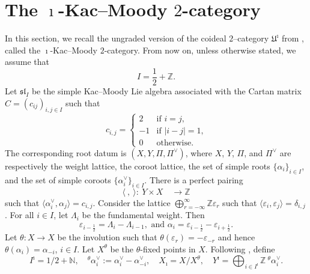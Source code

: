 \documentclass[a4,10pt]{amsart}
\numberwithin{equation}{section}
\theoremstyle{definition}
\newcommand{\thal}{{}^{\theta}\!\alpha}
\begin{document}
\section{The $\imath$-Kac--Moody $2$-category}
In this section, we recall  the ungraded version of  the coideal $2$--category $ \mathfrak  U^\imath$ from \cite[Definitions~3.1 and 3.3]{BSWW-icate}, called the $\imath$-Kac--Moody $2$-category. 
From now on, unless otherwise stated, we assume that  \begin{equation}\label{index-I} I=\frac{1}{2}+\mathbb Z.\end{equation}
Let $\mathfrak {sl}_I$ be the simple Kac--Moody Lie algebra %
associated with the  Cartan matrix $C=(c_{ij})_{i,j\in I}$  such that \begin{equation}\label{cij} c_{i, j}=\begin{cases}2 & \text{if $i=j$,}\\
-1 & \text{if $|i-j|=1$,}\\
0 & \text{otherwise.}\end{cases}
\end{equation}
The corresponding root datum  is $(X, Y, \Pi, \Pi^\vee)$, where $X$,  $Y$, $\Pi $, and  $\Pi^\vee$  are
respectively the weight lattice, the coroot lattice, the set of simple roots $\{\alpha_i\}_{i \in I}$,
and the set of simple coroots $\{\alpha_i^\vee\}_{i \in I}$. 
There is a  perfect pairing 
 \begin{equation}\label{equa-pairing1}
     \langle\  , \ \rangle: ~Y\times X\quad  \longrightarrow   \mathbb Z \end{equation} such that $\langle \alpha^\vee_i,\alpha_j\rangle= c_{i,j}$.  Consider the lattice $\bigoplus_{r=-\infty}^\infty \mathbb Z \varepsilon_r$ such that $\langle \varepsilon_i, \varepsilon_j\rangle=\delta_{i, j}$. For all $i\in I$,  let $\Lambda_i$ be the fundamental weight. Then
\begin{equation}\label{www1} \varepsilon_{i-\frac 12} =\Lambda_i-\Lambda_{i-1}, \text{ and } \alpha_i=\varepsilon_{i-\frac{1}{2}}-\varepsilon_{i+\frac{1}{2}}.\end{equation}     
     Let $\theta: X\rightarrow X$ be the involution  such that 
 $\theta(\varepsilon_r)=-\varepsilon_{-r}$ and hence  $\theta(\alpha_i)=\alpha_{-i}$, $i\in I$.
 Let $X^\theta$ be the $\theta$-fixed points in $X$. 
 Following \cite{BSWW-icate}, 
define   \begin{equation}\label{isimple}   I^\imath=1/2+\mathbb N, \quad  \thal^\vee_i:=\alpha_i^\vee -\alpha_{-i}^\vee, \quad X_\imath= X/X^\theta, \quad Y^\imath =\bigoplus_{i\in I^\imath} \mathbb Z \ \thal^\vee_i. \end{equation}  
\end{document}
